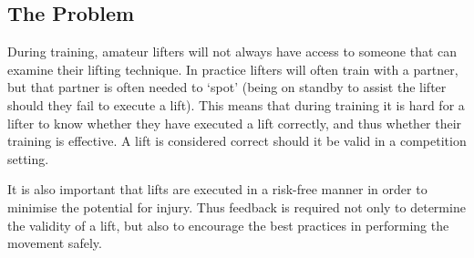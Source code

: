 \subsection{The Problem}

During training, amateur lifters will not always have access to someone that can examine their lifting technique. In practice lifters will often train with a partner, but that partner is often needed to `spot' (being on standby to assist the lifter should they fail to execute a lift). This means that during training it is hard for a lifter to know whether they have executed a lift correctly, and thus whether their training is effective. A lift is considered correct should it be valid in a competition setting.

It is also important that lifts are executed in a risk-free manner in order to minimise the potential for injury. Thus feedback is required not only to determine the validity of a lift, but also to encourage the best practices in performing the movement safely.